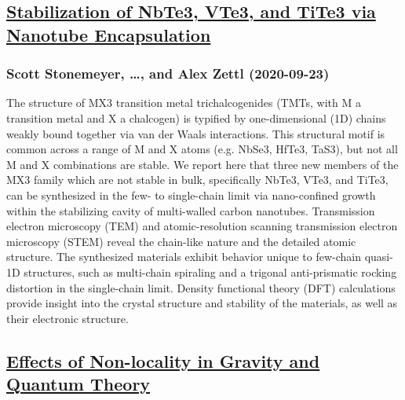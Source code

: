 {\subsection*{\href{http://arxiv.org/abs/2009.10869v1}{Stabilization of NbTe3, VTe3, and TiTe3 via Nanotube Encapsulation}}
\subsubsection*{Scott Stonemeyer, \dots, and Alex Zettl (2020-09-23)}
The structure of MX3 transition metal trichalcogenides (TMTs, with M a
transition metal and X a chalcogen) is typified by one-dimensional (1D) chains
weakly bound together via van der Waals interactions. This structural motif is
common across a range of M and X atoms (e.g. NbSe3, HfTe3, TaS3), but not all M
and X combinations are stable. We report here that three new members of the MX3
family which are not stable in bulk, specifically NbTe3, VTe3, and TiTe3, can
be synthesized in the few- to single-chain limit via nano-confined growth
within the stabilizing cavity of multi-walled carbon nanotubes. Transmission
electron microscopy (TEM) and atomic-resolution scanning transmission electron
microscopy (STEM) reveal the chain-like nature and the detailed atomic
structure. The synthesized materials exhibit behavior unique to few-chain
quasi-1D structures, such as multi-chain spiraling and a trigonal
anti-prismatic rocking distortion in the single-chain limit. Density functional
theory (DFT) calculations provide insight into the crystal structure and
stability of the materials, as well as their electronic structure.

\subsection*{\href{http://arxiv.org/abs/2009.10856v1}{Effects of Non-locality in Gravity and Quantum Theory}}
}
